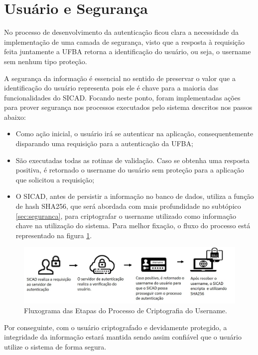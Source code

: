 \documentclass[12pt, a4paper]{report}
\begin{document}
\section{Usuário e Segurança}
\label{subsec:userseg}
No processo de desenvolvimento da autenticação ficou clara a necessidade da implementação de uma camada de segurança, visto que a resposta à requisição feita juntamente a \ac{UFBA} retorna a identificação do usuário, ou seja, o username sem nenhum tipo proteção.

A segurança da informação é essencial no sentido de preservar o valor que a identificação do usuário representa pois ele é chave para a maioria das funcionalidades do \ac{SICAD}. Focando neste ponto, foram implementadas ações para prover segurança nos processos executados pelo sistema descritos nos passos abaixo:

\begin{itemize}
\item Como ação inicial, o usuário irá se autenticar na aplicação, consequentemente disparando uma requisição para a autenticação da \ac{UFBA};
\item São executadas todas as rotinas de validação.
Caso se obtenha uma resposta positiva, é retornado o username do usuário sem proteção para a aplicação que solicitou a requisição;
\item O \ac{SICAD}, antes de persistir a informação no banco de dados, utiliza a função de hash SHA256, que será abordada com mais profundidade no subtópico \ref{sec:seguranca}, para criptografar o username utilizado como informação chave na utilização do sistema. Para melhor fixação, o fluxo do processo está representado na figura \ref{fig:fluxograma_criptografia}.
\end{itemize}

\begin{figure}
\centering
\includegraphics[scale=0.80]{fluxograma_criptografia.jpg}
\caption{Fluxograma das Etapas do Processo de Criptografia do Username.}
\label{fig:fluxograma_criptografia}
\end{figure}

Por conseguinte, com o usuário criptografado e devidamente protegido, a integridade da informação estará mantida sendo assim confiável que o usuário utilize o sistema de forma segura.
\end{document}
